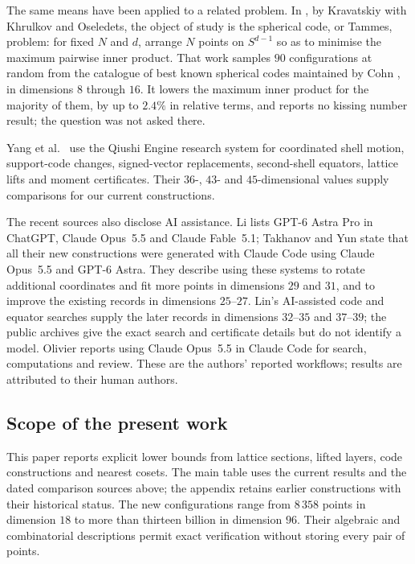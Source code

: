 \documentclass[11pt]{amsart}
\theoremstyle{remark}
\begin{document}
The same means have been applied to a related problem. In
\cite{kravatskiy-khrulkov-oseledets2026}, by Kravatskiy with Khrulkov and
Oseledets, the object of study is the spherical code, or Tammes, problem: for fixed
$N$ and $d$, arrange $N$ points on $S^{d-1}$ so as to minimise the maximum pairwise
inner product. That work samples $90$ configurations at random from the catalogue of best known
spherical codes maintained by Cohn \cite{cohn-spherical}, in dimensions $8$
through $16$. It lowers the maximum inner product for the majority of them, by up
to $2.4\%$ in relative terms, and reports no kissing number result; the question
was not asked there.

Yang et al.\ \cite{yang-etal2026} use the Qiushi Engine research system for
coordinated shell motion, support-code changes, signed-vector replacements,
second-shell equators, lattice lifts and moment certificates. Their $36$-, $43$-
and $45$-dimensional values supply comparisons for our current constructions.

The recent sources also disclose AI assistance. Li \cite{kli19-21-2026} lists
GPT-6 Astra Pro in ChatGPT, Claude Opus~5.5 and Claude Fable~5.1; Takhanov and
Yun \cite{takhanov-yun2026} state that all their new constructions were generated
with Claude Code using Claude Opus~5.5 and GPT-6 Astra. They describe using these
systems to rotate additional coordinates and fit more points in dimensions $29$
and $31$, and to improve the existing records in dimensions $25$--$27$. Lin's
AI-assisted code and equator searches supply the later records in dimensions
$32$--$35$ and $37$--$39$; the public archives give the exact search and
certificate details but do not identify a model. Olivier
\cite{olivier2026} reports using Claude Opus~5.5 in Claude Code for search,
computations and review. These are the authors' reported workflows; results are
attributed to their human authors.

\subsection{Scope of the present work}\label{ss:rw-position}

This paper reports explicit lower bounds from lattice sections, lifted layers, code
constructions and nearest cosets. The main table uses the current results and the
dated comparison sources above; the appendix retains earlier constructions with
their historical status. The new configurations range from $8\,358$ points in
dimension $18$ to more than thirteen billion in dimension $96$. Their algebraic
and combinatorial descriptions permit exact verification without storing every
pair of points.
\end{document}
